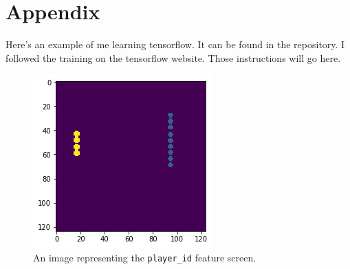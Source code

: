 \documentclass{amsart}
\theoremstyle{definition}
\begin{document}
\section{Appendix}


Here's an example of me learning tensorflow.
It can be found in the repository.
I followed the training on the tensorflow website.
Those instructions will go here.


\begin{figure}[h!]
    \includegraphics[width=1.0\linewidth]{fine}
    \caption{An image representing the {\tt player\_id} feature screen.}
\end{figure}
\end{document}
